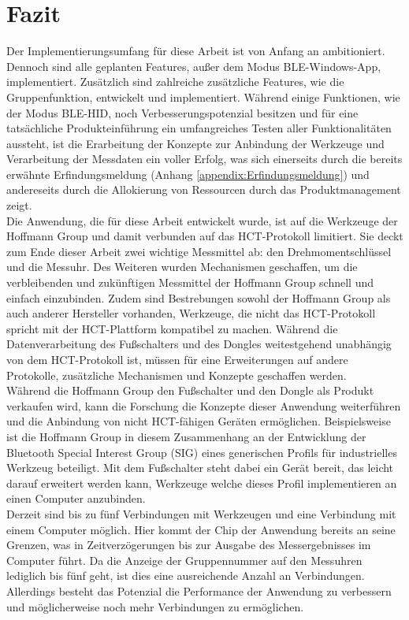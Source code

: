 \section{Fazit}
Der Implementierungsumfang für diese Arbeit ist von Anfang an ambitioniert. Dennoch sind alle geplanten Features, außer dem Modus \ac{BLE}-Windows-App, implementiert. Zusätzlich sind zahlreiche zusätzliche Features, wie die Gruppenfunktion, entwickelt und implementiert. Während einige Funktionen, wie der Modus \ac{BLE}-\ac{HID}, noch Verbesserungspotenzial besitzen und für eine tatsächliche Produkteinführung ein umfangreiches Testen aller Funktionalitäten aussteht, ist die Erarbeitung der Konzepte zur Anbindung der Werkzeuge und Verarbeitung der Messdaten ein voller Erfolg, was sich einerseits durch die bereits erwähnte Erfindungsmeldung (Anhang \ref{appendix:Erfindungsmeldung}) und andereseits durch die Allokierung von Ressourcen durch das Produktmanagement zeigt.\\
Die Anwendung, die für diese Arbeit entwickelt wurde, ist auf die Werkzeuge der Hoffmann Group und damit verbunden auf das \ac{HCT}-Protokoll limitiert. Sie deckt zum Ende dieser Arbeit zwei wichtige Messmittel ab: den Drehmomentschlüssel und die Messuhr. Des Weiteren wurden Mechanismen geschaffen, um die verbleibenden und zukünftigen Messmittel der Hoffmann Group schnell und einfach einzubinden. Zudem sind Bestrebungen sowohl der Hoffmann Group als auch anderer Hersteller vorhanden, Werkzeuge, die nicht das \ac{HCT}-Protokoll spricht mit der \ac{HCT}-Plattform kompatibel zu machen. Während die Datenverarbeitung des Fußschalters und des Dongles weitestgehend unabhängig von dem \ac{HCT}-Protokoll ist, müssen für eine Erweiterungen auf andere Protokolle, zusätzliche Mechanismen und Konzepte geschaffen werden.\\
Während die Hoffmann Group den Fußschalter und den Dongle als Produkt verkaufen wird, kann die Forschung die Konzepte dieser Anwendung weiterführen und die Anbindung von nicht \ac{HCT}-fähigen Geräten ermöglichen. Beispielsweise ist die Hoffmann Group in diesem Zusammenhang an der Entwicklung der Bluetooth Special Interest Group (SIG) eines generischen Profils für industrielles Werkzeug beteiligt. Mit dem Fußschalter steht dabei ein Gerät bereit, das leicht darauf erweitert werden kann, Werkzeuge welche dieses Profil implementieren an einen Computer anzubinden.\\
Derzeit sind bis zu fünf Verbindungen mit Werkzeugen und eine Verbindung mit einem Computer möglich. Hier kommt der Chip der Anwendung bereits an seine Grenzen, was in Zeitverzögerungen bis zur Ausgabe des Messergebnisses im Computer führt. Da die Anzeige der Gruppennummer auf den Messuhren lediglich bis fünf geht, ist dies eine ausreichende Anzahl an Verbindungen. Allerdings besteht das Potenzial die Performance der Anwendung zu verbessern und möglicherweise noch mehr Verbindungen zu ermöglichen.\\
